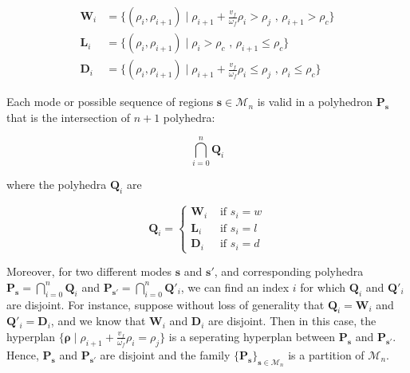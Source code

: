 \documentclass[11pt]{article}
\numberwithin{equation}{section}
\numberwithin{figure}{section}
\numberwithin{table}{section}
\begin{document}
\begin{equation}
\begin{array}{ll}
\textbf{W}_{i} & = \{(\rho_{i},\rho_{i+1}) \mid \rho_{i+1} + \frac{v_{f}}{\omega_{f}}\rho_{i} > \rho_{j} \text{ ,   } \rho_{i+1} > \rho_{c}\}\\
\textbf{L}_{i} & = \{(\rho_{i},\rho_{i+1}) \mid \rho_{i} > \rho_{c} \text{ ,   } \rho_{i+1} \leq \rho_{c}\}\\
\textbf{D}_{i} & = \{(\rho_{i},\rho_{i+1}) \mid \rho_{i+1} + \frac{v_{f}}{\omega_{f}}\rho_{i} \leq \rho_{j} \text{ ,   } \rho_{i} \leq \rho_{c}\}
\end{array}
\label{eq:regions3}
\end{equation}

\noindent Each mode or possible sequence of regions $\boldsymbol s \in \mathcal{M}_{n}$ is valid in a polyhedron $\textbf{P}_{\boldsymbol s}$ that is the intersection of $n+1$ polyhedra:

\begin{equation}
\bigcap_{i=0}^{n} \textbf{Q}_{i}
\label{eq:Hrepresentation}
\end{equation}

\noindent where the polyhedra $\textbf{Q}_{i}$ are

\begin{equation}
\textbf{Q}_{i}=
\begin{cases}
\textbf{W}_{i} & \text{ if } s_{i}=w\\
\textbf{L}_{i} & \text{ if } s_{i}=l\\
\textbf{D}_{i} & \text{ if } s_{i}=d
\end{cases}
\label{eq:Hrepresentation2}
\end{equation}


Moreover, for two different modes $\boldsymbol s$ and $\boldsymbol s'$, and corresponding polyhedra $\textbf{P}_{\boldsymbol s}=\bigcap_{i=0}^{n} \textbf{Q}_{i}$ and $\textbf{P}_{\boldsymbol s'}=\bigcap_{i=0}^{n} \textbf{Q}'_{i}$, we can find an index $i$ for which $\textbf{Q}_{i}$ and $\textbf{Q}'_{i}$ are disjoint. For instance, suppose without loss of generality that $\textbf{Q}_{i}=\textbf{W}_{i}$ and $\textbf{Q}'_{i}=\textbf{D}_{i}$, and we know that $\textbf{W}_{i}$ and $\textbf{D}_{i}$ are disjoint. Then in this case, the hyperplan $\{\boldsymbol \rho\mid\rho_{i+1} + \frac{v_{f}}{\omega_{f}}\rho_{i} = \rho_{j}\}$ is a seperating hyperplan between $\textbf{P}_{\boldsymbol s}$ and $\textbf{P}_{\boldsymbol s'}$. Hence, $\textbf{P}_{\boldsymbol s}$ and $\textbf{P}_{\boldsymbol s'}$ are disjoint and the family $\{\textbf{P}_{\boldsymbol s}\}_{\boldsymbol s \in \mathcal{M}_{n}}$ is a partition of $\mathcal{M}_{n}$.
\end{document}
